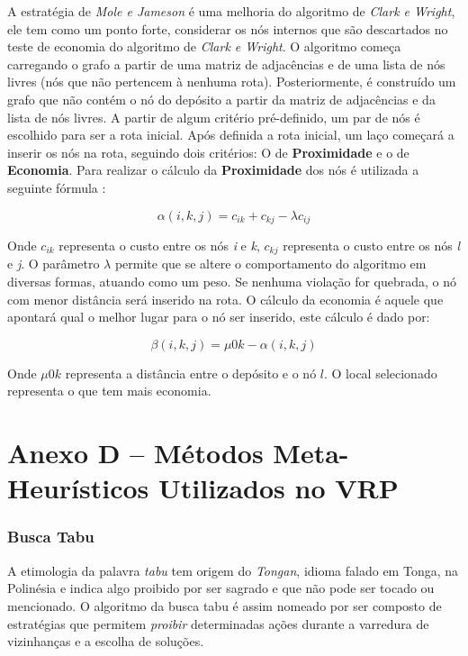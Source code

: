 A estratégia de \emph{Mole e Jameson} é uma melhoria do algoritmo de \emph{Clark e Wright}, ele tem como um ponto forte, considerar os nós internos que são descartados no teste de economia do algoritmo de \emph{Clark e Wright}. O algoritmo começa carregando o grafo a partir de uma matriz de adjacências e de uma lista de nós livres (nós que não pertencem à nenhuma rota). Posteriormente, é construído um grafo que não contém o nó do depósito a partir da matriz de adjacências e da lista de nós livres. A partir de algum critério pré-definido, um par de nós é escolhido para ser a rota inicial. Após definida a rota inicial, um laço começará a inserir os nós na rota, seguindo dois critérios: O de \textbf{Proximidade} e o de \textbf{Economia}.
Para realizar o cálculo da \textbf{Proximidade} dos nós é utilizada a seguinte fórmula \cite[p. 33]{maxwell}:

\[\alpha(i, k, j) = c_{ik} + c_{kj} - \lambda c_{ij} \]

Onde $c_{ik}$ representa o custo entre os nós \emph{i} e \emph{k}, $c_{kj}$  representa o custo entre os nós \emph{l} e \emph{j}. O parâmetro $\lambda$ permite que se altere o comportamento do algoritmo em diversas formas, atuando como um peso. Se nenhuma violação for quebrada, o nó com menor distância será inserido na rota. O cálculo da economia é aquele que apontará qual o melhor lugar para o nó ser inserido, este cálculo é dado por:

\[\beta(i, k, j) = \mu 0k - \alpha(i, k, j) \]


Onde \(\mu 0k\) representa a distância entre o depósito e o nó $l$. O local selecionado representa o que tem mais economia.

\chapter*{Anexo D -- Métodos Meta-Heurísticos Utilizados no VRP}
\label{anexo-metodos-metaheuristicos}
\subsection*{Busca Tabu}

A etimologia da palavra \emph{tabu} tem origem do \emph{Tongan}, idioma falado em Tonga, na Polinésia e indica algo proibido por ser sagrado e que não pode ser tocado ou mencionado. O algoritmo da busca tabu é assim nomeado por ser composto de estratégias que permitem \emph{proibir} determinadas ações durante a varredura de vizinhanças e a escolha de soluções.

